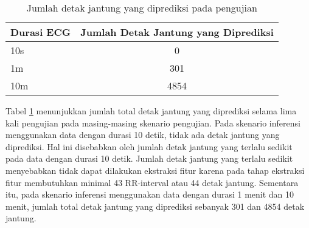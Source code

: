 

\begin{table}[H]
\centering
\caption{Jumlah detak jantung yang diprediksi pada pengujian}
\label{tab:jumlah-detak-jantung}
\begin{tabularx}{0.8\textwidth}{
  |>{\centering\arraybackslash}X
  |c
|}
\hline
\textbf{Durasi ECG} & \textbf{Jumlah Detak Jantung yang Diprediksi} \\ \hline
10s                 & 0                                              \\
\hline
1m                  & 301                                            \\
\hline
10m                 & 4854                                           \\ \hline
\end{tabularx}
\end{table}


Tabel \ref{tab:jumlah-detak-jantung} menunjukkan jumlah total detak jantung yang diprediksi selama lima kali pengujian pada masing-masing skenario pengujian.
Pada skenario inferensi menggunakan data dengan durasi 10 detik, tidak ada detak jantung yang diprediksi.
Hal ini disebabkan oleh jumlah detak jantung yang terlalu sedikit pada data dengan durasi 10 detik.
Jumlah detak jantung yang terlalu sedikit menyebabkan tidak dapat dilakukan ekstraksi fitur karena pada tahap ekstraksi fitur membutuhkan minimal 43 RR-interval atau 44 detak jantung.
Sementara itu, pada skenario inferensi menggunakan data dengan durasi 1 menit dan 10 menit, jumlah total detak jantung yang diprediksi sebanyak 301 dan 4854 detak jantung.



